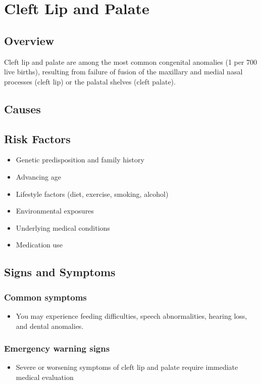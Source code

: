 \chapter{Cleft Lip and Palate}
\label{sec:Cleft Lip and Palate}

\section{Overview}
Cleft lip and palate are among the most common congenital anomalies (1 per 700 live births), resulting from failure of fusion of the maxillary and medial nasal processes (cleft lip) or the palatal shelves (cleft palate).
\section{Causes}
\section{Risk Factors}

\begin{itemize}[noitemsep]
  \item Genetic predisposition and family history
  \item Advancing age
  \item Lifestyle factors (diet, exercise, smoking, alcohol)
  \item Environmental exposures
  \item Underlying medical conditions
  \item Medication use
\end{itemize}
\section{Signs and Symptoms}

\subsection{Common symptoms}
\begin{itemize}[noitemsep]
  \item You may experience feeding difficulties, speech abnormalities, hearing loss, and dental anomalies. 
  \end{itemize}

\subsection{Emergency warning signs}
\begin{itemize}[noitemsep]
  \item Severe or worsening symptoms of cleft lip and palate require immediate medical evaluation
\end{itemize}
